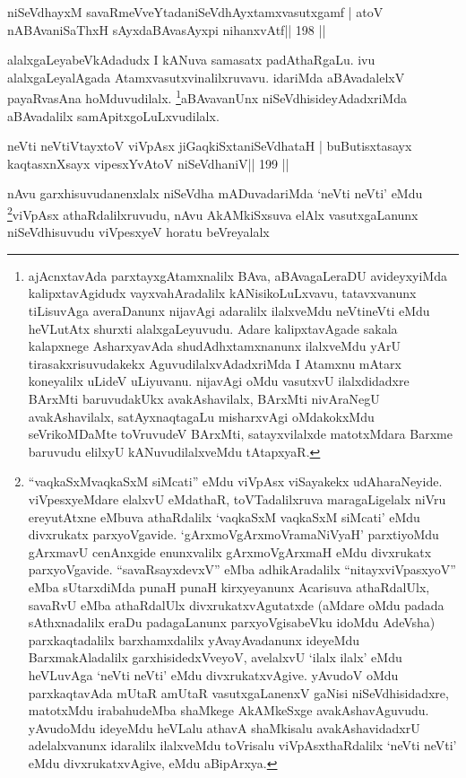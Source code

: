 \begin{shl}
niSeVdhayxM savaRmeVveYtadaniSeVdhAyxtamxvasutxgamf |
atoV nABAvaniSaThxH sAyxdaBAvasAyxpi nihanxvAtf\hfill || 198 ||
\end{shl}

\begin{artha}
alalxgaLeyabeVkAdadudx I kANuva samasatx padAthaRgaLu. ivu
alalxgaLeyalAgada
Atamxvasutxvinalilxruvavu. idariMda aBAvadalelxV payaRvasAna 
hoMduvudilalx. \footnote{ajAcnxtavAda
  parxtayxgAtamxnalilx BAva, aBAvagaLeraDU avideyxyiMda
  kalipxtavAgidudx vayxvahAradalilx kANisikoLuLxvavu, tatavxvanunx
  tiLisuvAga averaDanunx nijavAgi adaralilx ilalxveMdu neVtineVti eMdu
heVLutAtx shurxti alalxgaLeyuvudu. Adare kalipxtavAgade
sakala kalapxnege AsharxyavAda shudAdhxtamxnanunx ilalxveMdu yArU
tirasakxrisuvudakekx AguvudilalxvAdadxriMda I Atamxnu mAtarx
koneyalilx uLideV uLiyuvanu. nijavAgi oMdu vasutxvU ilalxdidadxre
BArxMti baruvudakUkx avakAshavilalx, BArxMti nivAraNegU
avakAshavilalx, satAyxnaqtagaLu misharxvAgi oMdakokxMdu seVrikoMDaMte
toVruvudeV BArxMti, satayxvilalxde matotxMdara Barxme baruvudu elilxyU
kANuvudilalxveMdu tAtapxyaR.}aBAvavanUnx niSeVdhisideyAdadxriMda aBAvadalilx samApitxgoLuLxvudilalx.
\end{artha}


\begin{shl}
neVti neVtiVtayxtoV viVpAsx jiGaqkiSxtaniSeVdhataH |
buButisxtasayx kaqtasxnXsayx vipesxYvAtoV niSeVdhaniV\hfill || 199 ||
\end{shl}

\begin{artha}
nAvu garxhisuvudanenxlalx niSeVdha mADuvadariMda `neVti neVti'
eMdu \footnote{``vaqkaSxMvaqkaSxM siMcati'' eMdu viVpAsx viSayakekx
  udAharaNeyide. viVpesxyeMdare elalxvU eMdathaR, toVTadalilxruva
  maragaLigelalx niVru ereyutAtxne eMbuva athaRdalilx `vaqkaSxM
  vaqkaSxM siMcati' eMdu divxrukatx parxyoVgavide.
  `gArxmoVgArxmoVramaNiVyaH' parxtiyoMdu gArxmavU cenAnxgide
  enunxvalilx gArxmoVgArxmaH eMdu divxrukatx parxyoVgavide.
  ``savaRsayxdevxV'' eMba adhikAradalilx ``nitayxviVpasxyoV'' eMba
  sUtarxdiMda punaH punaH kirxyeyanunx Acarisuva athaRdalUlx, savaRvU
  eMba athaRdalUlx divxrukatxvAgutatxde (aMdare oMdu padada
  sAthxnadalilx eraDu padagaLanunx parxyoVgisabeVku idoMdu AdeVsha)
  parxkaqtadalilx barxhamxdalilx yAvayAvadanunx ideyeMdu
  BarxmakAladalilx garxhisidedxVveyoV, avelalxvU `ilalx ilalx' eMdu
  heVLuvAga `neVti neVti' eMdu divxrukatxvAgive. yAvudoV oMdu
  parxkaqtavAda mUtaR amUtaR vasutxgaLanenxV gaNisi niSeVdhisidadxre,
  matotxMdu irabahudeMba shaMkege AkAMkeSxge avakAshavAguvudu.
  yAvudoMdu ideyeMdu heVLalu athavA shaMkisalu avakAshavidadxrU
  adelalxvanunx idaralilx ilalxveMdu toVrisalu viVpAsxthaRdalilx `neVti
  neVti' eMdu divxrukatxvAgive, eMdu aBipArxya.}viVpAsx athaRdalilxruvudu, nAvu AkAMkiSxsuva elAlx
vasutxgaLanunx niSeVdhisuvudu viVpesxyeV horatu beVreyalalx
\end{artha}

